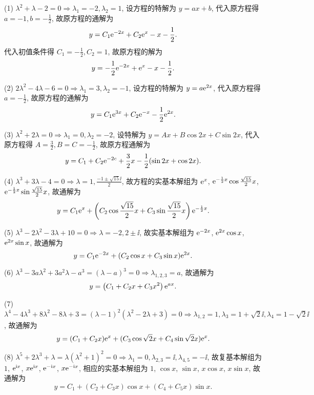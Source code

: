 \begin{solve}
  (1) $\lambda^2+\lambda-2=0\Rightarrow\lambda_1=-2,\lambda_2=1$, 
  设方程的特解为 $y=ax+b$, 代入原方程得 $a=-1,b=-\frac{1}{2}$, 故原方程的通解为
  \[y=C_1\mathrm{e}^{-2x}+C_2\mathrm{e}^x-x-\frac{1}{2}.\]
  代入初值条件得 $C_1=-\frac{1}{2},C_2=1$, 故原方程的解为
  \[y=-\frac{1}{2}\mathrm{e}^{-2x}+\mathrm{e}^x-x-\frac{1}{2}.\]

  (2) $2\lambda^2-4\lambda-6=0\Rightarrow\lambda_1=3,\lambda_2=-1$, 
  设方程的特解为 $y=a\mathrm{e}^{2x}$, 代入原方程得 $a=-\frac{1}{2}$, 故原方程的通解为
  \[y=C_1\mathrm{e}^{3x}+C_2\mathrm{e}^{-x}-\frac{1}{2}\mathrm{e}^{2x}.\]

  (3) $\lambda^2+2\lambda=0\Rightarrow\lambda_1=0,\lambda_2=-2$, 
  设特解为 $y=Ax+B\cos 2x+C\sin2x$, 代入原方程得 $A=\frac{3}{2},B=C=-\frac{1}{2}$, 故原方程通解为
  \[y=C_1+C_2\mathrm{e}^{-2c}+\frac{3}{2}x-\frac{1}{2}(\sin2x+\cos2x).\]

  (4) $\lambda^3+3\lambda-4=0\Rightarrow\lambda=1,\frac{-1\pm\sqrt{15}\ii}{2}$, 
  故方程的实基本解组为
  $\mathrm{e}^x$, $\mathrm{e}^{-\frac{1}{2}x}\cos\frac{\sqrt{15}}{2}x$, 
  $\mathrm{e}^{-\frac{1}{2}x}\sin\frac{\sqrt{15}}{2}x$, 故通解为
  \[y=C_1\mathrm{e}^x+\left(C_2\cos\frac{\sqrt{15}}{2}x+C_3\sin\frac{\sqrt{15}}{2}x\right)\mathrm{e}^{-\frac{1}{2}x}.\]

  (5) $\lambda^3-2\lambda^2-3\lambda+10=0\Rightarrow\lambda=-2,2\pm\ii$, 
  故实基本解组为 $\mathrm{e}^{-2x}$, $\mathrm{e}^{2x}\cos x$, $\mathrm{e}^{2x}\sin x$, 故通解为
  \[y=C_1\mathrm{e}^{-2x}+(C_2\cos x+C_3\sin x)\mathrm{e}^{2x}.\]

  (6) $\lambda^3-3a\lambda^2+3a^2\lambda-a^3=(\lambda-a)^3=0\Rightarrow\lambda_{1,2,3}=a$, 故通解为
  \[y=\left(C_1+C_2x+C_3x^2\right)\mathrm{e}^{ax}.\]

  (7) $\lambda^4-4\lambda^3+8\lambda^2-8\lambda+3=(\lambda-1)^2(\lambda^2-2\lambda+3)=0\Rightarrow\lambda_{1,2}=1,\lambda_3=1+\sqrt{2}\ii,\lambda_4=1-\sqrt{2}\ii$, 故通解为
  \[y=(C_1+C_2x)\mathrm{e}^x+(C_3\cos\sqrt{2}x+C_4\sin\sqrt{2}x)\mathrm{e}^x.\]

  (8) $\lambda^5+2\lambda^3+\lambda=\lambda(\lambda^2+1)^2=0\Rightarrow\lambda_1=0,\lambda_{2,3}=\ii,\lambda_{4,5}=-\ii$, 
  故复基本解组为 $1$, $\mathrm{e}^{\mathrm{i} x}$, $x\mathrm{e}^{\mathrm{i} x}$, $\mathrm{e}^{-\mathrm{i} x}$, $x\mathrm{e}^{-\mathrm{i} x}$, 
  相应的实基本解组为 $1$, $\cos x$, $\sin x$, $x\cos x$, $x\sin x$, 故通解为
  \[y=C_1+(C_2+C_3x)\cos x+(C_4+C_5x)\sin x.\]


\end{solve}
